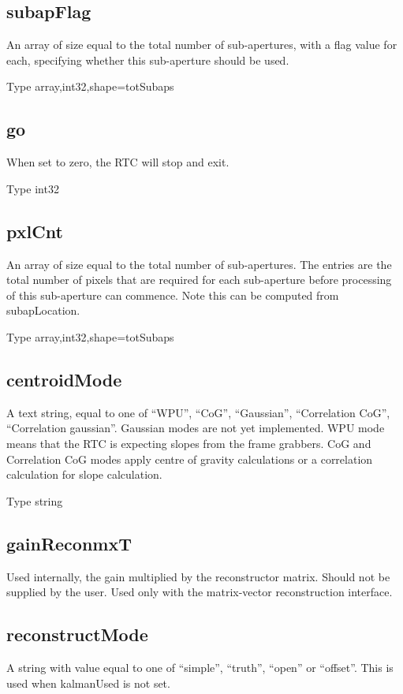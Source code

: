 \documentclass[a4,10pt]{article}
\begin{document}
\subsection{subapFlag}
An array of size equal to the total number of sub-apertures, with a
flag value for each, specifying whether this sub-aperture should be
used.

Type array,int32,shape=totSubaps

\subsection{go}
When set to zero, the RTC will stop and exit.

Type int32

\subsection{pxlCnt}
An array of size equal to the total number of sub-apertures.  The
entries are the total number of pixels that are required for each
sub-aperture before processing of this sub-aperture can commence.
Note this can be computed from subapLocation.

Type array,int32,shape=totSubaps

\subsection{centroidMode}
A text string, equal to one of ``WPU'', ``CoG'', ``Gaussian'',
``Correlation CoG'', ``Correlation gaussian''.  Gaussian modes are not
yet implemented.  WPU mode means that the RTC is expecting slopes from
the frame grabbers.  CoG and Correlation CoG modes apply centre of
gravity calculations or a correlation calculation for slope
calculation.

Type string


\subsection{gainReconmxT}
Used internally, the gain multiplied by the reconstructor matrix.
Should not be supplied by the user.  Used only with the matrix-vector
reconstruction interface.

\subsection{reconstructMode}
A string with value equal to one of ``simple'', ``truth'', ``open'' or
``offset''.  This is used when kalmanUsed is not set.
\end{document}
